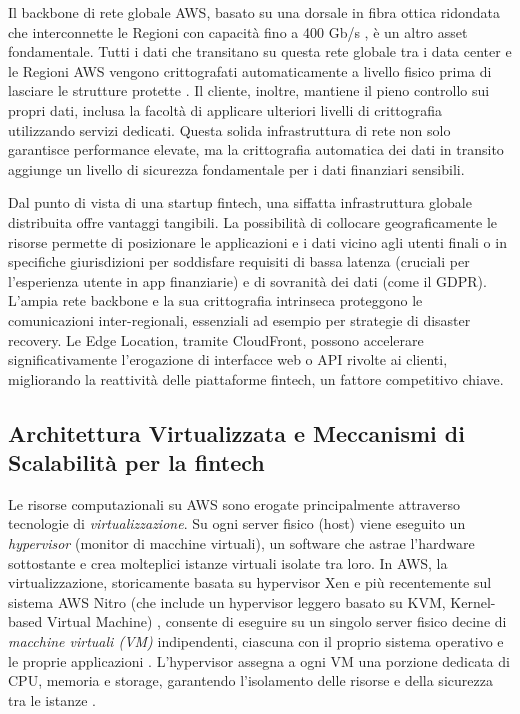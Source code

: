 Il backbone di rete globale AWS, basato su una dorsale in fibra ottica ridondata che interconnette le Regioni con capacità fino a 400 Gb/s \cite{aws-network}, è un altro asset fondamentale. Tutti i dati che transitano su questa rete globale tra i data center e le Regioni AWS vengono crittografati automaticamente a livello fisico prima di lasciare le strutture protette \cite{aws-network}. Il cliente, inoltre, mantiene il pieno controllo sui propri dati, inclusa la facoltà di applicare ulteriori livelli di crittografia utilizzando servizi dedicati. Questa solida infrastruttura di rete non solo garantisce performance elevate, ma la crittografia automatica dei dati in transito aggiunge un livello di sicurezza fondamentale per i dati finanziari sensibili.

Dal punto di vista di una startup fintech, una siffatta infrastruttura globale distribuita offre vantaggi tangibili. La possibilità di collocare geograficamente le risorse permette di posizionare le applicazioni e i dati vicino agli utenti finali o in specifiche giurisdizioni per soddisfare requisiti di bassa latenza (cruciali per l'esperienza utente in app finanziarie) e di sovranità dei dati (come il GDPR). L'ampia rete backbone e la sua crittografia intrinseca proteggono le comunicazioni inter-regionali, essenziali ad esempio per strategie di disaster recovery. Le Edge Location, tramite CloudFront, possono accelerare significativamente l'erogazione di interfacce web o API rivolte ai clienti, migliorando la reattività delle piattaforme fintech, un fattore competitivo chiave.

\subsection{Architettura Virtualizzata e Meccanismi di Scalabilità per la fintech}
\label{sec:virtualization-scalability-fintech}

Le risorse computazionali su AWS sono erogate principalmente attraverso tecnologie di \textit{virtualizzazione}. Su ogni server fisico (host) viene eseguito un \textit{hypervisor} (monitor di macchine virtuali), un software che astrae l'hardware sottostante e crea molteplici istanze virtuali isolate tra loro. In AWS, la virtualizzazione, storicamente basata su hypervisor Xen e più recentemente sul sistema AWS Nitro (che include un hypervisor leggero basato su KVM, Kernel-based Virtual Machine) \cite{aws-nitro-hypervisor}, consente di eseguire su un singolo server fisico decine di \textit{macchine virtuali (VM)} indipendenti, ciascuna con il proprio sistema operativo e le proprie applicazioni \cite{ibm_iaas}. L'hypervisor assegna a ogni VM una porzione dedicata di CPU, memoria e storage, garantendo l'isolamento delle risorse e della sicurezza tra le istanze \cite{ibm_iaas}.

